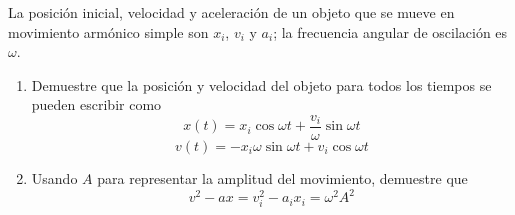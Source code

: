\item La posición inicial, velocidad y aceleración de un objeto que se mueve en movimiento armónico simple son $x_i$, $v_i$ y $a_i$; la frecuencia angular de oscilación es $\omega$.
\begin{enumerate}
    \item Demuestre que la posición y velocidad del objeto para todos los tiempos se pueden escribir como
    $$ x(t) = x_i \cos \omega t + \frac{v_i}{\omega} \sin \omega t $$
    $$ v(t) = -x_i \omega \sin \omega t + v_i \cos \omega t $$
    \item Usando $A$ para representar la amplitud del movimiento, demuestre que
    $$ v^2 - ax = v_i^2 - a_i x_i = \omega^2 A^2 $$
\end{enumerate}